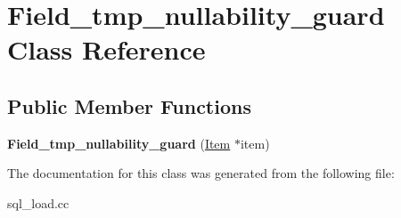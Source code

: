\hypertarget{classField__tmp__nullability__guard}{}\section{Field\+\_\+tmp\+\_\+nullability\+\_\+guard Class Reference}
\label{classField__tmp__nullability__guard}
\subsection*{Public Member Functions}
\begin{DoxyCompactItemize}
\item 
\mbox{\label{classField__tmp__nullability__guard_aff4510fb50e110c63104b357563f80e1}} 
{\bfseries Field\+\_\+tmp\+\_\+nullability\+\_\+guard} (\mbox{\hyperlink{classItem}{Item}} $\ast$item)
\end{DoxyCompactItemize}


The documentation for this class was generated from the following file\+:\begin{DoxyCompactItemize}
\item 
sql\+\_\+load.\+cc\end{DoxyCompactItemize}
